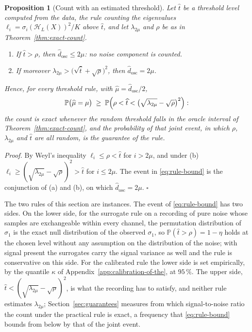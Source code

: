 \documentclass{article}
\newtheorem{proposition}{\bf Proposition}
\begin{document}
\begin{proposition}[Count with an estimated threshold] \label{prop:estimated}
Let $\widehat{t}$ be a threshold level computed from the data, the rule counting the eigenvalues $\ell_i = \sigma_i(\mathcal{H}_L(X))^{2}/K$ above $\widehat{t}$, and let $\lambda_{2\mu}$ and $\rho$ be as in Theorem~\ref{thm:exact-count}.
\begin{enumerate}
\renewcommand{\labelenumi}{(\alph{enumi})}
\item If $\widehat{t} > \rho$, then $\widehat{d}_{\mathrm{osc}} \le 2\mu$: no noise component is counted.
\item If moreover $\lambda_{2\mu} > \bigl(\sqrt{\widehat{t}} + \sqrt{\rho}\bigr)^{2}$, then $\widehat{d}_{\mathrm{osc}} = 2\mu$.
\end{enumerate}
Hence, for every threshold rule, with $\widehat{\mu} = \widehat{d}_{\mathrm{osc}}/2$,
\begin{equation} \label{eq:rule-bound}
\mathbb{P}\bigl(\widehat{\mu} = \mu\bigr) \;\ge\; \mathbb{P}\Bigl(\rho < \widehat{t} < \bigl(\sqrt{\lambda_{2\mu}} - \sqrt{\rho}\bigr)^{2}\Bigr):
\end{equation}
the count is exact whenever the random threshold falls in the oracle interval of Theorem~\ref{thm:exact-count}, and the probability of that joint event, in which $\rho$, $\lambda_{2\mu}$ and $\widehat{t}$ are all random, is the guarantee of the rule.
\end{proposition}

\textit{Proof.} By Weyl's inequality $\ell_i \le \rho < \widehat{t}$ for $i > 2\mu$, and under (b) $\ell_i \ge (\sqrt{\lambda_{2\mu}} - \sqrt{\rho})^{2} > \widehat{t}$ for $i \le 2\mu$. The event in \eqref{eq:rule-bound} is the conjunction of (a) and (b), on which $\widehat{d}_{\mathrm{osc}} = 2\mu$. $\square$

The two rules of this section are instances. The event of \eqref{eq:rule-bound} has two sides. On the lower side, for the surrogate rule on a recording of pure noise whose samples are exchangeable within every channel, the permutation distribution of $\sigma_1$ is the exact null distribution of the observed $\sigma_1$, so $\mathbb{P}(\widehat{t} > \rho) = 1 - \eta$ holds at the chosen level without any assumption on the distribution of the noise; with signal present the surrogates carry the signal variance as well and the rule is conservative on this side. For the calibrated rule the lower side is set empirically, by the quantile $\kappa$ of Appendix~\ref{app:calibration-of-the}, at $95\,\%$. The upper side, $\widehat{t} < (\sqrt{\lambda_{2\mu}} - \sqrt{\rho})^{2}$, is what the recording has to satisfy, and neither rule estimates $\lambda_{2\mu}$; Section~\ref{sec:guarantees} measures from which signal-to-noise ratio the count under the practical rule is exact, a frequency that \eqref{eq:rule-bound} bounds from below by that of the joint event.
\end{document}
